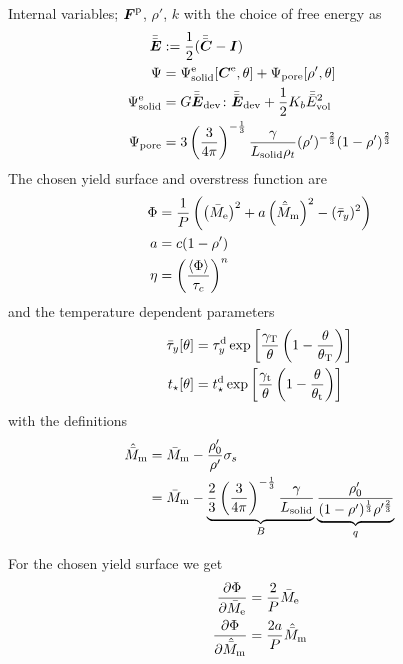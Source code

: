 \documentclass[a4paper,11pt]{article}
\newcommand{\ts}[1]{\text{\boldmath $#1$}}
\newcommand{\pderiv}[2]{\frac{\partial #1}{\partial #2}}
\newcommand{\dev}{{\rm dev}}
\newcommand{\vol}{{\rm vol}}
\newcommand{\rmd}{{\rm d}}
\newcommand{\rme}{{\rm e}}
\newcommand{\rmm}{{\rm m}}
\newcommand{\rmp}{{\rm p}}
\newcommand{\rmT}{{\rm T}}
\newcommand{\rmt}{{\rm t}}
\newcommand{\defeq}{:=}
\begin{document}
Internal variables; $\ts F^\rmp$, $\rho'$, $k$ with the choice of free energy as
\begin{align*}
	\bar{\bar{\ts E}} &\defeq \frac12(\bar{\bar{\ts C}}-\ts I)\\
	\Psi &= \Psi_{\rm solid}^\rme[\ts C^\rme,\theta] + \Psi_{\rm pore}[\rho',\theta]\\
	\Psi_{\rm solid}^\rme &=  G \bar{\bar{\ts E}}_\dev\colon\bar{\bar{\ts E}}_\dev + \frac12 K_b \bar{\bar{E}}_\vol^2\\
	\Psi_{\rm pore} &= 3\left(\frac{3}{4\pi}\right)^{-\frac13} \frac{\gamma}{L_{\rm solid}\rho_t}(\rho')^{-\frac23}(1-\rho')^{\frac23}
\end{align*}
The chosen yield surface and overstress function are
\begin{align*}
	\Phi &=\frac{1}{P} \left(\left(\bar{M}_\rme\right)^2 + a \left(\hat{\bar M}_\rmm\right)^2 - (\bar\tau_y)^2\right)\\
	a &= c (1-\rho')\\
	\eta &= \left(\frac{\langle\Phi\rangle}{\tau_c}\right)^n
\end{align*}
and the temperature dependent parameters
\begin{align*}
	\bar\tau_y[\theta] &= \tau_y^\rmd \exp\left[\frac{\gamma_\rmT}{\theta}\left(1-\frac{\theta}{\theta_\rmT}\right)\right]\\
	t_\star[\theta] &= t_\star^\rmd \exp\left[\frac{\gamma_\rmt}{\theta}\left(1-\frac{\theta}{\theta_\rmt}\right)\right]
\end{align*}
with the definitions 
\begin{align*}
	\hat{\bar M}_\rmm &= \bar M_\rmm - \frac{\rho_0'}{\rho'}\sigma_s \\
	&= \bar M_\rmm - \underbrace{\frac23\left(\frac{3}{4\pi}\right)^{-\frac13} \frac{\gamma}{L_{\rm solid}}}_{B}\underbrace{\frac{\rho_0'}{(1-\rho')^{\frac13}\rho'^{\frac23}}}_{q}
\end{align*}

For the chosen yield surface we get
\begin{align*}
	\pderiv{\Phi}{\bar M_\rme} &= \frac{2}{P}\bar M_\rme\\
	\pderiv{\Phi}{\hat{\bar M}_\rmm} &= \frac{2 a}{P}\hat{\bar M}_\rmm 
\end{align*}
\end{document}
